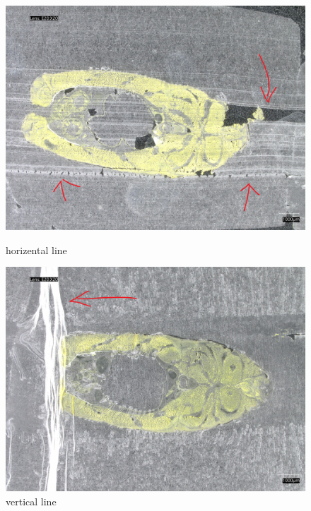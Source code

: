 \begin{figure}[H]
    \centering
    \begin{minipage}{0.33\textwidth}
        \centering
        \includegraphics[width=\textwidth]{./fig/sample_1/horizental_line - 副本.jpg}
        \caption{horizental line}
        \label{fig:horizental_line}
    \end{minipage}
    \begin{minipage}{0.33\textwidth}
        \centering
        \includegraphics[width=\textwidth]{./fig/sample_1/vertical_line - 副本.jpg}
        \caption{vertical line}
        \label{fig:vertical_line}
    \end{minipage}
\end{figure}

